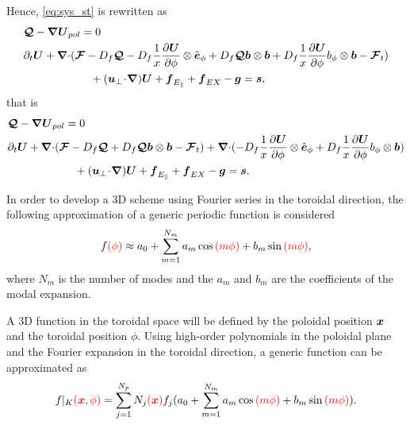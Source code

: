 \documentclass[a4paper,10pt]{article}
\newcommand{\bm}[1]{\text{\boldmath$#1$\unboldmath}}
\newcommand{\scal}{\! \cdot \! }
\newcommand{\parti}[2]{\frac{\partial #1}{\partial #2}}
\newcommand{\bu}{\bm{u}}
\newcommand{\Div}{{\bm{\nabla}\cdot}}
\newcommand{\Grad}{\bm{\nabla}}
\renewcommand{\b}{\bm{b}}
\newcommand{\DiscFunc}[1]{\bm{#1}}
\newcommand{\SecOrdTens}[1]{\bm{\mathcal{#1}}}
\renewcommand{\u}{\DiscFunc{U}}
\newcommand{\F}{\SecOrdTens{F}}
\newcommand{\G}{\SecOrdTens{Q}}
\newcommand{\bigsp}{\qquad \qquad \qquad}
\newcommand{\fo}[1]{{ \color{red} ( #1 )\color{black} }} %
\begin{document}
Hence, \ref{eq:sys_st} is rewritten as 
\begin{equation*}
\begin{aligned}
&\G -\Grad \u_{pol} = 0\\ 
&\partial_t \u+ \Div ( \F -D_f \G -D_f\frac{1}{x} \parti{\u}{\phi} \otimes\hat{\bm{e}}_{\phi} + D_f \G\b \otimes \b +D_f \frac{1}{x} \parti{\u}{\phi} b_{\phi}\otimes \b - \F_t)\\
 & \bigsp+ (\bu_\bot\scal\Grad)\u +  \bm{f}_{E_{\parallel}}+ \bm{f}_{EX}-\bm{g} = \bm{s},
\end{aligned}
\end{equation*}
that is
\begin{equation*}\label{eq:sys_st_four}
\begin{aligned}
&\G -\Grad \u_{pol} = 0\\ 
&\partial_t \u+ \Div ( \F -D_f \G  + D_f \G\b \otimes \b  - \F_t) + \Div (-D_f\frac{1}{x} \parti{\u}{\phi} \otimes\hat{\bm{e}}_{\phi} +D_f \frac{1}{x} \parti{\u}{\phi} b_{\phi}\otimes \b)\\
 & \bigsp+ (\bu_\bot\scal\Grad)\u +  \bm{f}_{E_{\parallel}}+ \bm{f}_{EX}-\bm{g} = \bm{s}.  
\end{aligned}
\end{equation*}

% 


In order to develop a 3D scheme using Fourier series in the toroidal direction, the following approximation of a generic periodic function is considered
\[
 f\fo{\phi} \approx a_0 + \sum_{m=1}^{N_m} a_m \cos\fo{m\phi} + b_m \sin\fo{m\phi},
\]
where $N_m$ is the number of modes and the $a_m$ and $b_m$ are the coefficients of the modal expansion.

A 3D function in the toroidal space will be defined by the poloidal position $\bm{x}$ and the toroidal position $\phi$. Using high-order polynomials in the poloidal plane and the Fourier expansion in the toroidal direction, a generic function can be approximated as
\[
 f|_{K}\fo{\bm{x},\phi} = \sum_{j=1}^{N_p} N_j\fo{\bm{x}} f_j ( a_0 + \sum_{m=1}^{N_m} a_m \cos\fo{m\phi} + b_m \sin\fo{m\phi}).
\]
\end{document}
